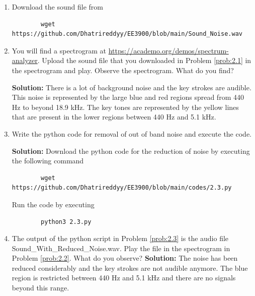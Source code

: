 \documentclass[journal,12pt,twocolumn]{IEEEtran}
\newcommand{\solution}{\noindent \textbf{Solution: }}
\numberwithin{equation}{section}
\renewcommand\thesection{\arabic{section}}
\begin{document}
	\begin{enumerate}[label=\thesection.\arabic*,ref=\thesection.\theenumi]
	\item \label{prob:2.1} Download the sound file from  
	\begin{lstlisting}
		wget https://github.com/Dhatrireddyy/EE3900/blob/main/Sound_Noise.wav
	\end{lstlisting}
	
	\item \label{prob:2.2} You will find a spectrogram at \href{https://academo.org/demos/spectrum-analyzer}{\url{https://academo.org/demos/spectrum-analyzer}}. Upload the sound file that you downloaded in Problem \ref{prob:2.1} in the spectrogram  and play.  Observe the spectrogram. What do you find?
	
	\solution There is a lot of background noise and the key strokes are audible. This noise is represented by the large blue and red regions spread from 440 Hz to beyond 18.9 kHz. The key tones are represented by the yellow lines that are present in the lower regions between 440 Hz and 5.1 kHz.
	
	\item \label{prob:2.3} Write the python code for removal of out of band noise and execute the code. 
	
	\solution Download the python code for the reduction of noise by executing the following command
	\begin{lstlisting}
		wget https://github.com/Dhatrireddyy/EE3900/blob/main/codes/2.3.py
	\end{lstlisting}
	
	Run the code by executing
	\begin{lstlisting}
		python3 2.3.py
	\end{lstlisting}
	
	\item The output of the python script in Problem \ref{prob:2.3} is the audio file Sound\_With\_Reduced\_Noise.wav. Play the file in the spectrogram in Problem \ref{prob:2.2}. What do you observe?
	\solution The noise has been reduced considerably and the key strokes are not audible anymore. The blue region is restricted between 440 Hz and 5.1 kHz and there are no signals beyond this range.
	
	\end{enumerate}
	
\end{document}
